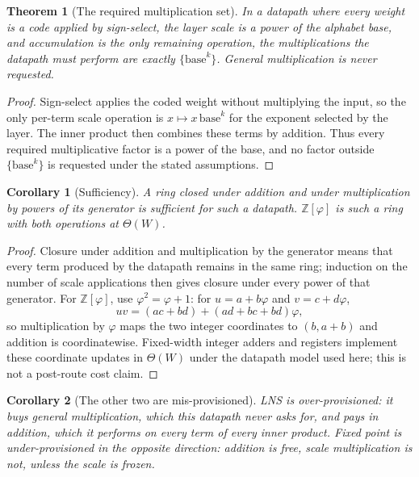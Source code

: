 \documentclass[11pt]{article}
\newtheorem{theorem}{Theorem}
\newtheorem{corollary}{Corollary}
\theoremstyle{definition}
\begin{document}
\begin{theorem}[The required multiplication set]
\label{thm:reqmul}
In a datapath where every weight is a code applied by sign-select, the layer
scale is a power of the alphabet base, and accumulation is the only remaining
operation, the multiplications the datapath must perform are exactly
$\{\text{base}^{k}\}$. General multiplication is never requested.
\end{theorem}
\begin{proof}
Sign-select applies the coded weight without multiplying the input, so the only
per-term scale operation is $x\mapsto x\,\text{base}^{k}$ for the exponent
selected by the layer.  The inner product then combines these terms by
addition.  Thus every required multiplicative factor is a power of the base,
and no factor outside $\{\text{base}^{k}\}$ is requested under the stated
assumptions.
\end{proof}

\begin{corollary}[Sufficiency]
\label{cor:sufficiency}
A ring closed under addition and under multiplication by powers of its generator
is sufficient for such a datapath. $\mathbb{Z}[\varphi]$ is such a ring with both
operations at $\Theta(W)$.
\end{corollary}
\begin{proof}
Closure under addition and multiplication by the generator means that every
term produced by the datapath remains in the same ring; induction on the number
of scale applications then gives closure under every power of that generator.
For $\mathbb{Z}[\varphi]$, use $\varphi^2=\varphi+1$: for
$u=a+b\varphi$ and $v=c+d\varphi$,
\[
 uv=(ac+bd)+(ad+bc+bd)\varphi,
\]
so multiplication by $\varphi$ maps the two integer coordinates to
$(b,a+b)$ and addition is coordinatewise.  Fixed-width integer adders and
registers implement these coordinate updates in $\Theta(W)$ under the
datapath model used here; this is not a post-route cost claim.
\end{proof}

\begin{corollary}[The other two are mis-provisioned]
\label{cor:misprov}
LNS is over-provisioned: it buys general multiplication, which this datapath
never asks for, and pays in addition, which it performs on every term of every
inner product. Fixed point is under-provisioned in the opposite direction:
addition is free, scale multiplication is not, unless the scale is frozen.
\end{corollary}
\end{document}
